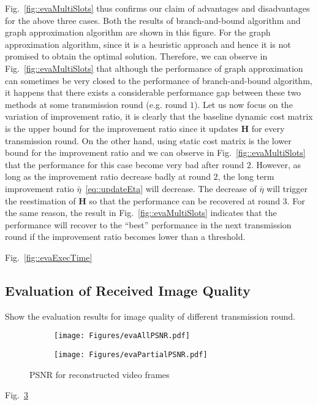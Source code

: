 Fig.~\ref{fig::evaMultiSlots} thus confirms our claim of advantages and disadvantages for the above three cases.
Both the results of branch-and-bound algorithm and graph approximation algorithm are shown in this figure.
For the graph approximation algorithm, since it is a heuristic approach and hence it is not promised to obtain the optimal solution.
Therefore, we can observe in Fig.~\ref{fig::evaMultiSlots} that although the performance of graph approximation can sometimes be very closed to the performance of branch-and-bound algorithm, it happens that there exists a considerable performance gap between these two methods at some transmission round (e.g. round $1$).
Let us now focus on the variation of improvement ratio, it is clearly that the baseline dynamic cost matrix is the upper bound for the improvement ratio since it updates $\mathbf{H}$ for every transmission round.
On the other hand, using static cost matrix is the lower bound for the improvement ratio and we can observe in Fig.~\ref{fig::evaMultiSlots} that the performance for this case become very bad after round $2$.
However, as long as the improvement ratio decrease badly at round $2$, the long term improvement ratio $\bar{\eta}$~\eqref{eq::updateEta} will decrease.
The decrease of $\bar{\eta}$ will trigger the reestimation of $\mathbf{H}$ so that the performance can be recovered at round $3$.
For the same reason, the result in Fig.~\ref{fig::evaMultiSlots} indicates that the performance will recover to the ``best'' performance in the next transmission round if the improvement ratio becomes lower than a threshold.

Fig.~\ref{fig::evaExecTime}

\subsection{Evaluation of Received Image Quality}
{\color{red}Show the evaluation results for image quality of different transmission round.}
\begin{figure}
\begin{center}
\begin{subfigure}[b]{\columnwidth}
\texttt{[image: Figures/evaAllPSNR.pdf]}
\caption{\label{fig::evaAllPSNR}}
\end{subfigure}
\begin{subfigure}[b]{\columnwidth}
\texttt{[image: Figures/evaPartialPSNR.pdf]}
\caption{\label{fig::evaPartialPSNR}}
\end{subfigure}
\caption{\label{fig::evaMultiRunPSNR} PSNR for reconstructed video frames}
\end{center}
\end{figure}
%
Fig.~\ref{fig::evaMultiRunPSNR}